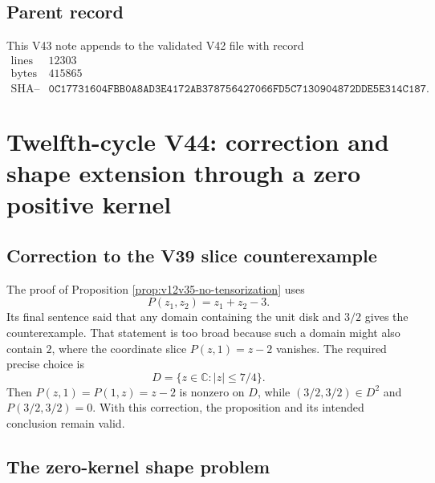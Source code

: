 \documentclass[11pt]{article}
\theoremstyle{remark}
\begin{document}
\subsection{Parent record}

This V43 note appends to the validated V42 file with record
\[
\begin{array}{c|c}
\text{lines}&12303\\
\text{bytes}&415865\\
\text{SHA--256}&
\texttt{0C17731604FBB0A8AD3E4172AB378756427066FD5C7130904872DDE5E314C187}.
\end{array}
\]


\section{Twelfth-cycle V44: correction and shape extension through a
zero positive kernel}
\label{sec:v12v44}

\subsection{Correction to the V39 slice counterexample}

The proof of Proposition \ref{prop:v12v35-no-tensorization} uses
\[
 P(z_1,z_2)=z_1+z_2-3.
\]
Its final sentence said that any domain containing the unit disk and
\(3/2\) gives the counterexample.  That statement is too broad
because such a domain might also contain \(2\), where the coordinate
slice \(P(z,1)=z-2\) vanishes.  The required precise choice is
\begin{equation}
                         D=\{z\in\mathbb C:|z|\leq7/4\}.    \tag{44.1}
\end{equation}
Then \(P(z,1)=P(1,z)=z-2\) is nonzero on \(D\), while
\((3/2,3/2)\in D^2\) and \(P(3/2,3/2)=0\).  With this correction,
the proposition and its intended conclusion remain valid.

\subsection{The zero-kernel shape problem}
\end{document}
